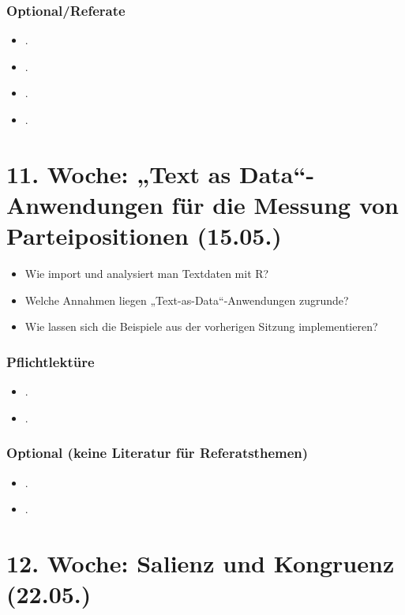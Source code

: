 \documentclass[abstract=on,parskip=full,headings=standardclasses,fontsize=11pt,paper=a4]{scrartcl}
\begin{document}
\subsubsection*{Optional/Referate}
\begin{itemize}
\item {}.
\item {}.
\item {}.
\item {}.
\end{itemize}


\section{11. Woche: „Text as Data“-Anwendungen für die Messung von Parteipositionen (15.05.)}



\begin{itemize}
\renewcommand\labelitemi{--}
\item Wie import und analysiert man Textdaten mit \textsf{R}?
\item Welche Annahmen liegen „Text-as-Data“-Anwendungen zugrunde?
\item Wie lassen sich die Beispiele aus der vorherigen Sitzung implementieren?
\end{itemize}

\subsubsection*{Pflichtlektüre}
\begin{itemize}
\item {}.
\item {}.
\end{itemize}


\subsubsection*{Optional (keine Literatur für Referatsthemen)}
\begin{itemize}
\item {}.
\item {}.
\end{itemize}


\section{12. Woche: Salienz und Kongruenz (22.05.)}
\end{document}
